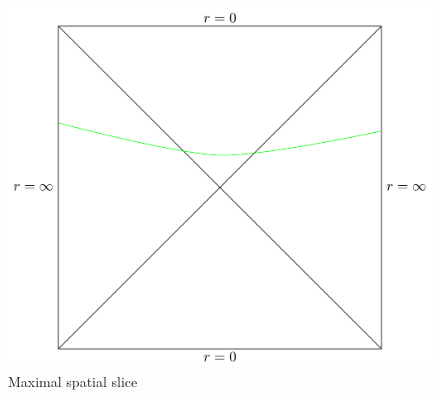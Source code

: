 \documentclass[8pt,aspectratio=169]{beamer}
\begin{document}
\begin{frame}
\begin{minipage}[t]{0.44\linewidth}
\begin{figure}
\begin{center}
        \includegraphics[scale=0.3]{CV}     
    
    \end{center}
    \caption{Maximal spatial slice}
    \label{fig:WDW}
\end{figure}

\end{minipage}

\end{frame}
\end{document}
